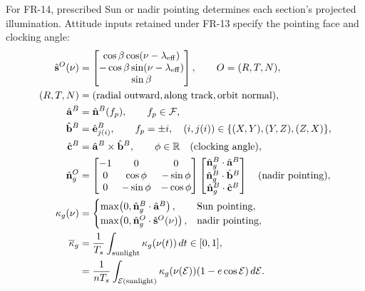For FR-14, prescribed Sun or nadir pointing determines each section's projected illumination. Attitude inputs retained under FR-13 specify the pointing face and clocking angle:
\begin{align}
    \hat{\mathbf s}^{O}(\nu)
    &=\begin{bmatrix}
        \cos\beta\cos(\nu-\lambda_{\mathrm{eff}})\\
        -\cos\beta\sin(\nu-\lambda_{\mathrm{eff}})\\
        \sin\beta
    \end{bmatrix},\qquad
    O=(R,T,N),
    \label{eq:orbital-sun-direction} \\
    (R,T,N)&=(\text{radial outward},\text{along track},\text{orbit normal}),
    \notag \\
    \hat{\mathbf a}^{B}&=\hat{\mathbf n}^{B}(f_p),\qquad
    f_p\in\mathcal F,
    \label{eq:pointing-face-normal} \\
    \hat{\mathbf b}^{B}&=\hat{\mathbf e}^{B}_{j(i)},\qquad
    f_p=\pm i,\quad
    (i,j(i))\in\{(X,Y),(Y,Z),(Z,X)\},
    \notag \\
    \hat{\mathbf c}^{B}&=\hat{\mathbf a}^{B}\times\hat{\mathbf b}^{B},\qquad
    \phi\in\mathbb R\quad\text{(clocking angle)},
    \label{eq:pointing-reference-basis} \\
    \hat{\mathbf n}^{O}_g
    &=\begin{bmatrix}
        -1&0&0\\
        0&\cos\phi&-\sin\phi\\
        0&-\sin\phi&-\cos\phi
    \end{bmatrix}
    \begin{bmatrix}
        \hat{\mathbf n}^{B}_g\cdot\hat{\mathbf a}^{B}\\
        \hat{\mathbf n}^{B}_g\cdot\hat{\mathbf b}^{B}\\
        \hat{\mathbf n}^{B}_g\cdot\hat{\mathbf c}^{B}
    \end{bmatrix}
    \quad\text{(nadir pointing)},
    \label{eq:nadir-panel-normal} \\
    \kappa_g(\nu)
    &=\begin{cases}
        \max\!\left(0,\hat{\mathbf n}^{B}_g\cdot\hat{\mathbf a}^{B}\right),
        &\text{Sun pointing},\\
        \max\!\left(0,\hat{\mathbf n}^{O}_g\cdot\hat{\mathbf s}^{O}(\nu)\right),
        &\text{nadir pointing},
    \end{cases}
    \label{eq:array-projected-illumination} \\
    \overline\kappa_g
    &=\frac{1}{T_s}\int_{\mathrm{sunlight}}\kappa_g(\nu(t))\,dt
    \in[0,1],
    \label{eq:array-sunlight-projection} \\
    &=\frac{1}{nT_s}\int_{\mathcal E(\mathrm{sunlight})}
      \kappa_g(\nu(\mathcal E))(1-e\cos\mathcal E)\,d\mathcal E.
    \notag
\end{align}
